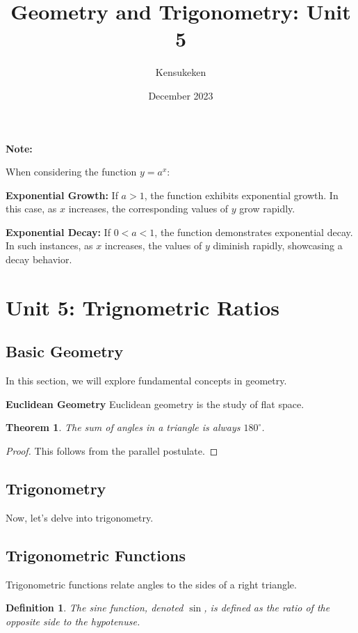 \documentclass[12pt,a4paper]{article}
\newenvironment{note}
  {\begin{framed}\colorbox{noteboxcolor}{
  \parbox{\dimexpr\linewidth-2\fboxsep}{
  \textbf{Note:}}}}
  {\end{framed}}
\newtheorem{theorem}{Theorem}[section]
\newtheorem{definition}{Definition}[section]
\begin{document}
\begin{note}
    When considering the function \(y=a^x\):

    \textbf{Exponential Growth:} If $a > 1$, the function exhibits exponential growth. In this case, as $x$ increases, the corresponding values of $y$ grow rapidly.

    \textbf{Exponential Decay:} If $0 < a < 1$, the function demonstrates exponential decay. In such instances, as $x$ increases, the values of $y$ diminish rapidly, showcasing a decay behavior.
\end{note}
\newpage

\title{Geometry and Trigonometry: Unit 5}
\author{Kensukeken}
\date{December 2023}
\maketitle

\section{Unit 5: Trignometric Ratios}
\subsection{Basic Geometry}
In this section, we will explore fundamental concepts in geometry.

\textbf{Euclidean Geometry}
Euclidean geometry is the study of flat space.

\begin{theorem}
The sum of angles in a triangle is always $180^\circ$.
\end{theorem}

\begin{proof}
This follows from the parallel postulate.
\end{proof}

\subsection{Trigonometry}
Now, let's delve into trigonometry.

\subsection{Trigonometric Functions}
Trigonometric functions relate angles to the sides of a right triangle.

\begin{definition}
The sine function, denoted $\sin$, is defined as the ratio of the opposite side to the hypotenuse.
\end{definition}
\end{document}
